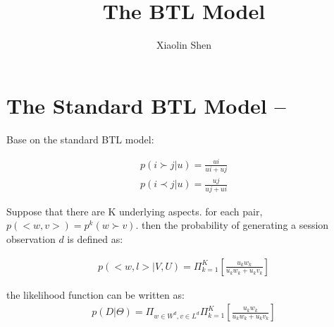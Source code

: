\documentclass{article}
\title{The BTL Model}
\author{Xiaolin Shen}
\begin{document}
\maketitle


\section{The Standard BTL Model --}
Base on the standard BTL model:

\begin{align*}
	p(i \succ j |u)=\frac{ui}{ui+ uj} \\
	p(i \prec j |u)=\frac{uj}{uj+ ui} 
\end{align*}

 Suppose that there are K underlying aspects. for each pair, $p(<w,v>) = p^k(w\succ v) $. then the probability of generating a session observation $d$ is defined as:

\begin{align}
p(<w,l>|V,U)
= \Pi_{k=1}^{K}[ {\frac{u_k w_k}{u_k w_k+u_k v_k}}]
\end{align}

the likelihood function can be written as:
\begin{align}
p(D|\Theta)
=\Pi_{w\in W^d, v\in L^d} \Pi_{k=1}^{K}[{\frac{u_k w_k}{u_k w_k+u_k v_k}}]
\end{align}
\end{document}
